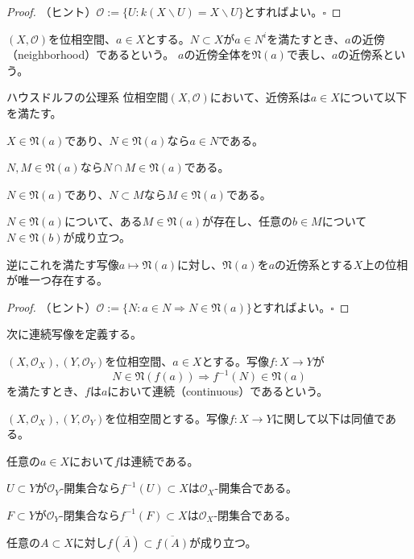 \documentclass[../root.tex]{subfiles}
\begin{document}
\begin{proof}
（ヒント）$ \mathcal{O}:=\lbrace U : k( X\backslash U )=X\backslash U \rbrace $とすればよい。$ \square $
\end{proof}

\begin{Def}{}{}
$ ( X, \mathcal{O} ) $を位相空間、$ a\in X $とする。$ N\subset X $が$ a\in N^{i} $を満たすとき、$ a $の近傍（neighborhood）であるという。
$ a $の近傍全体を$ \mathfrak{N}( a ) $で表し、$ a $の近傍系という。
\end{Def}

\begin{Exc}{ハウスドルフの公理系}{}
位相空間$ ( X, \mathcal{O} ) $において、近傍系は$ a\in X $について以下を満たす。
\begin{EnumCond}
\item $ X\in\mathfrak{N}( a ) $であり、$ N\in\mathfrak{N}( a ) $なら$ a\in N $である。
\item $ N, M\in\mathfrak{N}( a ) $なら$ N\cap M\in\mathfrak{N}( a ) $である。
\item $ N\in\mathfrak{N}( a ) $であり、$ N\subset M $なら$ M\in\mathfrak{N}( a ) $である。
\item $ N\in\mathfrak{N}( a ) $について、ある$ M\in\mathfrak{N}( a ) $が存在し、任意の$ b\in M $について$ N\in\mathfrak{N}( b ) $が成り立つ。
\end{EnumCond}

逆にこれを満たす写像$ a\mapsto\mathfrak{N}( a ) $に対し、$ \mathfrak{N}( a ) $を$ a $の近傍系とする$ X $上の位相が唯一つ存在する。 
\end{Exc}

\begin{proof}
（ヒント）$ \mathcal{O}:=\lbrace N : a\in N \Rightarrow N\in\mathfrak{N}( a ) \rbrace $とすればよい。$ \square $
\end{proof}

次に連続写像を定義する。

\begin{Def}{}{}
$ ( X, \mathcal{O}_{X} ), ( Y, \mathcal{O}_{Y} ) $を位相空間、$ a\in X $とする。写像$ f\colon X\rightarrow Y $が
\[ N\in\mathfrak{N}( f( a ) )\Rightarrow f^{-1}( N )\in\mathfrak{N}( a ) \]
を満たすとき、$ f $は$ a $において連続（continuous）であるという。
\end{Def}

\begin{Prop}{}{}
$ ( X, \mathcal{O}_{X} ), ( Y, \mathcal{O}_{Y} ) $を位相空間とする。写像$ f\colon X\rightarrow Y $に関して以下は同値である。
\begin{EnumEquiv}
\item 任意の$ a\in X $において$ f $は連続である。
\item $ U\subset Y $が$ \mathcal{O}_{Y} $-開集合なら$ f^{-1}( U )\subset X $は$ \mathcal{O}_{X} $-開集合である。
\item $ F\subset Y $が$ \mathcal{O}_{Y} $-閉集合なら$ f^{-1}( F )\subset X $は$ \mathcal{O}_{X} $-閉集合である。
\item 任意の$ A\subset X $に対し$ f( \overline{A} )\subset\overline{f( A )} $が成り立つ。
\end{EnumEquiv}
\end{Prop}
\end{document}
